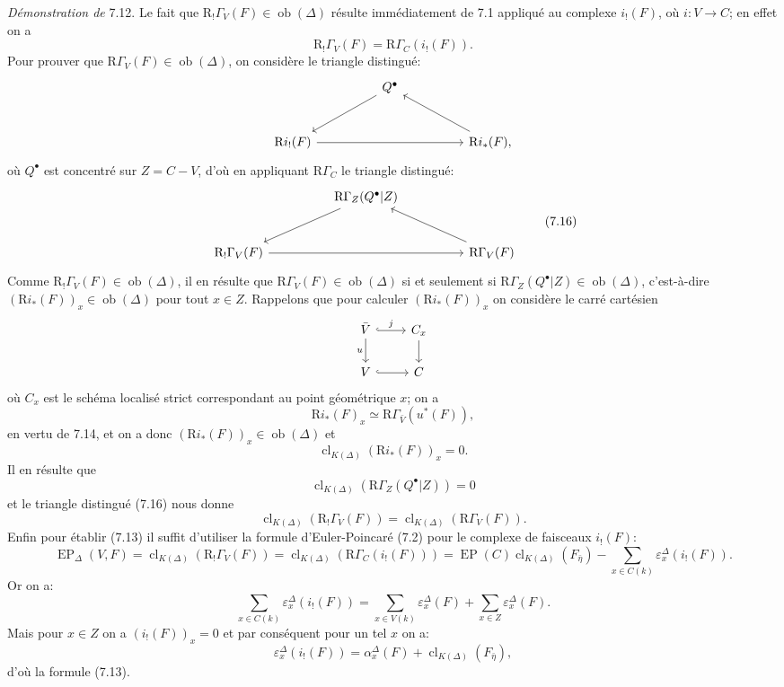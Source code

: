 \documentclass[11pt]{article}
\newcommand{\R}{\mathrm{R}}\newcommand{\RHomCore}{\mathrm{RHom}}
\providecommand{\EP}{\operatorname{EP}}
\providecommand{\Ob}{\operatorname{ob}}
\providecommand{\Ob}{\operatorname{ob}}
\providecommand{\R}{\mathrm R}
\providecommand{\EP}{\operatorname{EP}}
\providecommand{\Ob}{\operatorname{Ob}}
\providecommand{\clK}[1]{\operatorname{cl}_{K(#1)}}
\providecommand{\RG}{\R\Gamma}
\providecommand{\Ob}{\operatorname{ob}}
\providecommand{\Ob}{\operatorname{Ob}}
\begin{document}
\emph{Démonstration de} 7.12. Le fait que $\mathrm{R}_!\Gamma_V(F)\in\Ob(\Delta)$ résulte immédiatement de 7.1 appliqué au complexe $i_!(F)$, où $i:V\to C$; en effet on a
\[
\mathrm{R}_!\Gamma_V(F)=\mathrm{R}\Gamma_C(i_!(F)).
\]
Pour prouver que $\mathrm{R}\Gamma_V(F)\in\Ob(\Delta)$, on considère le triangle distingué:
\[
\begin{tikzcd}[column sep=huge,row sep=large]
& Q^\bullet \arrow[dl] &\\
\mathrm{R} i_!(F) \arrow[rr] && \mathrm{R} i_*(F) \arrow[ul],
\end{tikzcd}
\]
où $Q^\bullet$ est concentré sur $Z=C-V$, d'où en appliquant $\mathrm{R}\Gamma_C$ le triangle distingué:
\[
\begin{tikzcd}[column sep=huge,row sep=large]
& \mathrm{R}\Gamma_Z(Q^\bullet|Z) \arrow[dl] &\\
\mathrm{R}_!\Gamma_V(F) \arrow[rr] && \RG_V(F) \arrow[ul]
\end{tikzcd}
\tag{7.16}
\]
Comme $\mathrm{R}_!\Gamma_V(F)\in\Ob(\Delta)$, il en résulte que $\mathrm{R}\Gamma_V(F)\in\Ob(\Delta)$ si et seulement si $\mathrm{R}\Gamma_Z(Q^\bullet|Z)\in\Ob(\Delta)$, c'est-à-dire $(\mathrm{R} i_*(F))_x\in\Ob(\Delta)$ pour tout $x\in Z$. Rappelons que pour calculer $(\mathrm{R} i_*(F))_x$ on considère le carré cartésien
\[
\begin{tikzcd}
\bar V \arrow[r,hook,"j"] \arrow[d,"u"'] & C_x \arrow[d]\\
V \arrow[r,hook] & C
\end{tikzcd}
\]
où $C_x$ est le schéma localisé strict correspondant au point géométrique $x$; on a
\[
\mathrm{R} i_*(F)_x\simeq \mathrm{R}\Gamma_{\bar V}(u^*(F)),
\]
en vertu de 7.14, et on a 
donc $(\mathrm{R} i_*(F))_x\in\Ob(\Delta)$ et
\[
\clK{\Delta}(\mathrm{R} i_*(F))_x=0.
\]
Il en résulte que
\[
\clK{\Delta}(\mathrm{R}\Gamma_Z(Q^\bullet|Z))=0
\]
et le
triangle distingué (7.16) nous donne
\[
\clK{\Delta}(\mathrm{R}_!\Gamma_V(F))=\clK{\Delta}(\mathrm{R}\Gamma_V(F)).
\]
Enfin pour établir (7.13) il suffit d'utiliser la formule d'Euler-Poincaré (7.2) pour le complexe de faisceaux $i_!(F)$:
\[
\EP_\Delta(V,F)
=
\clK{\Delta}(\mathrm{R}_!\Gamma_V(F))
=
\clK{\Delta}(\mathrm{R}\Gamma_C(i_!(F)))
=
\EP(C)\clK{\Delta}(F_{\bar\eta})
-\sum_{x\in C(k)}\varepsilon_x^\Delta(i_!(F)).
\]
Or on a:
\[
\sum_{x\in C(k)}\varepsilon_x^\Delta(i_!(F))
=
\sum_{x\in V(k)}\varepsilon_x^\Delta(F)
+\sum_{x\in Z}\varepsilon_x^\Delta(F).
\]
Mais pour $x\in Z$ on a $(i_!(F))_x=0$ et par conséquent pour un tel $x$ on a:
\[
\varepsilon_x^\Delta(i_!(F))
=
\alpha_x^\Delta(F)+\clK{\Delta}(F_{\bar\eta}),
\]
d'où la formule (7.13).
\end{document}
